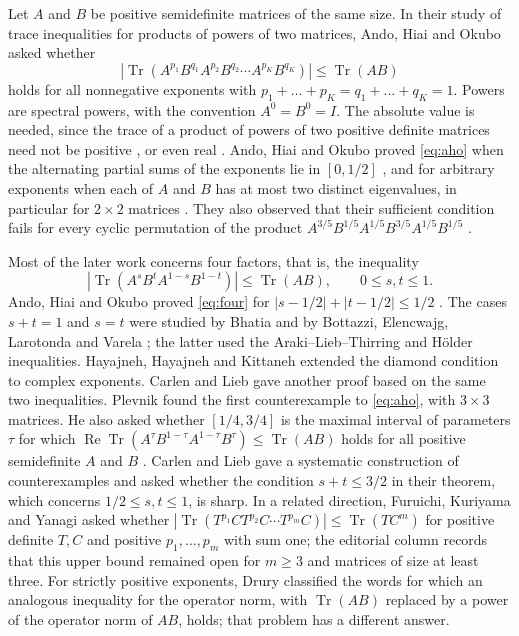 \documentclass{amsart}
\theoremstyle{definition}
\theoremstyle{remark}
\numberwithin{equation}{section}
\newcommand{\Tr}{\operatorname{Tr}}
\begin{document}
Let $A$ and $B$ be positive semidefinite matrices of the same size. In their study of trace inequalities for products of powers of two matrices, Ando, Hiai and Okubo \cite{AHO} asked whether
\begin{equation}\label{eq:aho}
|\Tr(A^{p_1}B^{q_1}A^{p_2}B^{q_2}\cdots A^{p_K}B^{q_K})|\le\Tr(AB)
\end{equation}
holds for all nonnegative exponents with $p_1+\dots+p_K=q_1+\dots+q_K=1$. Powers are spectral powers, with the convention $A^0=B^0=I$. The absolute value is needed, since the trace of a product of powers of two positive definite matrices need not be positive \cite{HJ}, or even real \cite{FKY}. Ando, Hiai and Okubo proved \eqref{eq:aho} when the alternating partial sums of the exponents lie in $[0,1/2]$ \cite[Theorem~2.1]{AHO}, and for arbitrary exponents when each of $A$ and $B$ has at most two distinct eigenvalues, in particular for $2\times 2$ matrices \cite[Theorem~4.1, Corollaries~4.3 and~4.4]{AHO}. They also observed that their sufficient condition fails for every cyclic permutation of the product $A^{3/5}B^{1/5}A^{1/5}B^{3/5}A^{1/5}B^{1/5}$ \cite[p.~312]{AHO}.

Most of the later work concerns four factors, that is, the inequality
\begin{equation}\label{eq:four}
|\Tr(A^{s}B^{t}A^{1-s}B^{1-t})|\le\Tr(AB),\qquad 0\le s,t\le 1 .
\end{equation}
Ando, Hiai and Okubo proved \eqref{eq:four} for $|s-1/2|+|t-1/2|\le 1/2$ \cite[Corollary~2.2]{AHO}. The cases $s+t=1$ and $s=t$ were studied by Bhatia \cite{Bh} and by Bottazzi, Elencwajg, Larotonda and Varela \cite{BELV}; the latter used the Araki--Lieb--Thirring and H\"older inequalities. Hayajneh, Hayajneh and Kittaneh \cite{HHK} extended the diamond condition to complex exponents. Carlen and Lieb \cite{CL} gave another proof based on the same two inequalities. Plevnik \cite{Pl} found the first counterexample to \eqref{eq:aho}, with $3\times 3$ matrices. He also asked whether $[1/4,3/4]$ is the maximal interval of parameters $\tau$ for which $\operatorname{Re}\Tr(A^{\tau}B^{1-\tau}A^{1-\tau}B^{\tau})\le\Tr(AB)$ holds for all positive semidefinite $A$ and $B$ \cite[Question~2.3]{Pl}. Carlen and Lieb \cite[Section~IV]{CL} gave a systematic construction of counterexamples and asked whether the condition $s+t\le 3/2$ in their theorem, which concerns $1/2\le s,t\le 1$, is sharp. In a related direction, Furuichi, Kuriyama and Yanagi \cite{FKY} asked whether $|\Tr(T^{p_1}CT^{p_2}C\cdots T^{p_m}C)|\le\Tr(TC^m)$ for positive definite $T,C$ and positive $p_1,\dots,p_m$ with sum one; the editorial column \cite{Br} records that this upper bound remained open for $m\ge 3$ and matrices of size at least three. For strictly positive exponents, Drury \cite{Dr} classified the words for which an analogous inequality for the operator norm, with $\Tr(AB)$ replaced by a power of the operator norm of $AB$, holds; that problem has a different answer.
\end{document}
